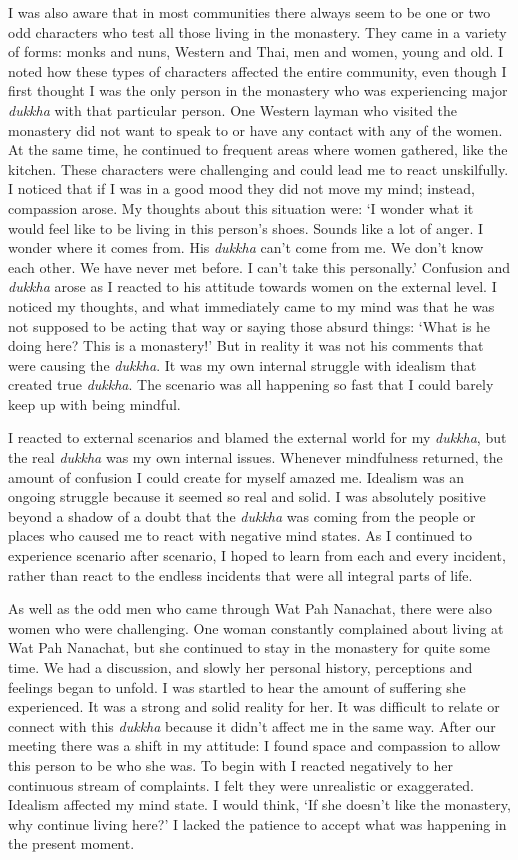 I was also aware that in most communities there always seem to be one or
two odd characters who test all those living in the monastery. They came
in a variety of forms: monks and nuns, Western and Thai, men and women, 
young and old. I noted how these types of characters affected the entire
community, even though I first thought I was the only person in the
monastery who was experiencing major \emph{dukkha} with that particular
person. One Western layman who visited the monastery did not want to
speak to or have any contact with any of the women. At the same time, he
continued to frequent areas where women gathered, like the kitchen. 
These characters were challenging and could lead me to react
unskilfully. I noticed that if I was in a good mood they did not move my
mind; instead, compassion arose. My thoughts about this situation were: 
`I wonder what it would feel like to be living in this person's shoes. 
Sounds like a lot of anger. I wonder where it comes from. His
\emph{dukkha} can't come from me. We don't know each other. We have
never met before. I can't take this personally.' Confusion and
\emph{dukkha} arose as I reacted to his attitude towards women on the
external level. I noticed my thoughts, and what immediately came to my
mind was that he was not supposed to be acting that way or saying those
absurd things: `What is he doing here? This is a monastery!' But in
reality it was not his comments that were causing the \emph{dukkha}. It
was my own internal struggle with idealism that created true
\emph{dukkha}. The scenario was all happening so fast that I could
barely keep up with being mindful.

I reacted to external scenarios and
blamed the external world for my \emph{dukkha}, but the real
\emph{dukkha} was my own internal issues. Whenever mindfulness returned, 
the amount of confusion I could create for myself amazed me. Idealism
was an ongoing struggle because it seemed so real and solid. I was
absolutely positive beyond a shadow of a doubt that the \emph{dukkha}
was coming from the people or places who caused me to react with
negative mind states. As I continued to experience scenario after
scenario, I hoped to learn from each and every incident, rather than
react to the endless incidents that were all integral parts of life. 

As well as the odd men who came through Wat Pah Nanachat, there were
also women who were challenging. One woman constantly complained about
living at Wat Pah Nanachat, but she continued to stay in the monastery
for quite some time. We had a discussion, and slowly her personal
history, perceptions and feelings began to unfold. I was startled to
hear the amount of suffering she experienced. It was a strong and solid
reality for her. It was difficult to relate or connect with this
\emph{dukkha} because it didn't affect me in the same way. After our
meeting there was a shift in my attitude: I found space and compassion
to allow this person to be who she was. To begin with I reacted
negatively to her continuous stream of complaints. I felt they were
unrealistic or exaggerated. Idealism affected my mind state. I would
think, `If she doesn't like the monastery, why continue living here?' I
lacked the patience to accept what was happening in the present moment. 

